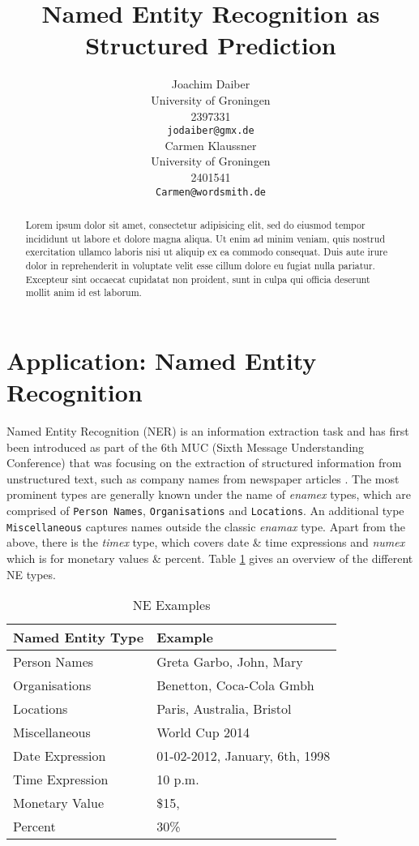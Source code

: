 \documentclass[11pt]{article}
\title{Named Entity Recognition as Structured Prediction}
\author{Joachim Daiber \\
  University of Groningen \\
  2397331\\
  {\tt jodaiber@gmx.de} \\\And
  Carmen Klaussner \\
  University of Groningen \\
  2401541\\
  {\tt Carmen@wordsmith.de} \\}
\date{}
\begin{document}
\maketitle

\begin{abstract}
Lorem ipsum dolor sit amet, consectetur adipisicing elit, sed do eiusmod tempor incididunt ut labore et dolore magna aliqua. Ut enim ad minim veniam, quis nostrud exercitation ullamco laboris nisi ut aliquip ex ea commodo consequat. Duis aute irure dolor in reprehenderit in voluptate velit esse cillum dolore eu fugiat nulla pariatur. Excepteur sint occaecat cupidatat non proident, sunt in culpa qui officia deserunt mollit anim id est laborum.
\end{abstract}


\section{Application: Named Entity Recognition}

Named Entity Recognition (NER) is an information extraction task and has first been introduced as part of the 6th MUC (Sixth Message Understanding Conference)
that was focusing on the extraction of structured information from unstructured text, such as company names from newspaper articles \cite{nadeau2007survey}.
The most prominent types are generally known under the name of \emph{enamex} types, which are comprised of \texttt{Person Names}, 
\texttt{Organisations} and \texttt{Locations}. 
An additional type \texttt{Miscellaneous} captures names outside the classic \emph{enamax} type.
Apart from the above, there is the \emph{timex} type, which covers date \& time expressions and \emph{numex} which is for monetary values \& percent. 
Table \ref{table:NETypes} gives an overview of the different NE types.

\begin{table}[h!]
\scriptsize
\begin{tabular}{| l | l |}
\hline
\bf Named Entity Type & \bf Example \\
\hline
Person Names & Greta Garbo, John, Mary \\
Organisations& Benetton, Coca-Cola Gmbh\\
Locations&  Paris, Australia, Bristol\\
Miscellaneous& World Cup 2014\\
 Date Expression& 01-02-2012, January, 6th, 1998 \\
Time Expression & 10 p.m.\\
Monetary Value &  \$15, \textsterling 100    \\
Percent &   30\% \\
\hline
\end{tabular}
\caption{NE Examples}
\label{table:NETypes}
\end{table}
\end{document}
